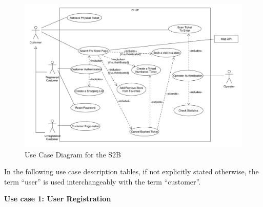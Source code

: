 \medskip
\begin{figure}[H]
    \includegraphics[width=\textwidth]{Images/UML_use_case.pdf}
    \caption{\label{fig:Use_Case_Full_Diag}Use Case Diagram for the S2B}
\end{figure}


\medskip
\clearpage
In the following use case description tables, if not explicitly stated otherwise, the term ``user'' is used interchangeably with the term ``customer''.
\medskip

\textbf{Use case 1: User Registration}
\smallskip

